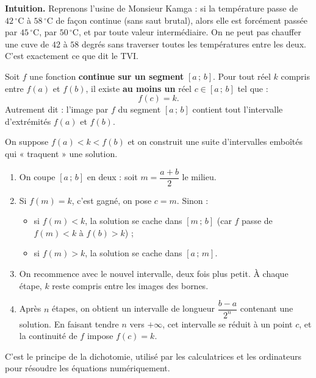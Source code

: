 \documentclass[11pt]{article}
\newcommand{\cle}[1]{{\popxbold\color{popdark}#1}}
\begin{document}
\textbf{Intuition.} Reprenons l'usine de Monsieur Kamga : si la température passe de $42\,^\circ\mathrm{C}$ à $58\,^\circ\mathrm{C}$ de façon continue (sans saut brutal), alors elle est forcément passée par $45\,^\circ\mathrm{C}$, par $50\,^\circ\mathrm{C}$, et par toute valeur intermédiaire. On ne peut pas chauffer une cuve de $42$ à $58$ degrés sans traverser toutes les températures entre les deux. C'est exactement ce que dit le TVI.

\begin{propriete}
Soit $f$ une fonction \textbf{continue sur un segment} $[a\,;\,b]$. Pour tout réel $k$ compris entre $f(a)$ et $f(b)$, il existe \textbf{au moins un} réel $c \in [a\,;\,b]$ tel que :
\[ f(c) = k. \]
Autrement dit : l'image par $f$ du segment $[a\,;\,b]$ contient tout l'intervalle d'extrémités $f(a)$ et $f(b)$.
\end{propriete}

\begin{experience}
On suppose $f(a) < k < f(b)$ et on construit une suite d'intervalles emboîtés qui « traquent » une solution.
\begin{enumerate}
\item On coupe $[a\,;\,b]$ en deux : soit $m = \dfrac{a+b}{2}$ le milieu.
\item Si $f(m) = k$, c'est gagné, on pose $c = m$. Sinon :
   \begin{itemize}
   \item si $f(m) < k$, la solution se cache dans $[m\,;\,b]$ (car $f$ passe de $f(m) < k$ à $f(b) > k$) ;
   \item si $f(m) > k$, la solution se cache dans $[a\,;\,m]$.
   \end{itemize}
\item On recommence avec le nouvel intervalle, deux fois plus petit. À chaque étape, $k$ reste compris entre les images des bornes.
\item Après $n$ étapes, on obtient un intervalle de longueur $\dfrac{b-a}{2^n}$ contenant une solution. En faisant tendre $n$ vers $+\infty$, cet intervalle se réduit à un point $c$, et la continuité de $f$ impose $f(c) = k$.
\end{enumerate}
C'est le principe de la \cle{dichotomie}, utilisé par les calculatrices et les ordinateurs pour résoudre les équations numériquement.
\end{experience}
\end{document}
